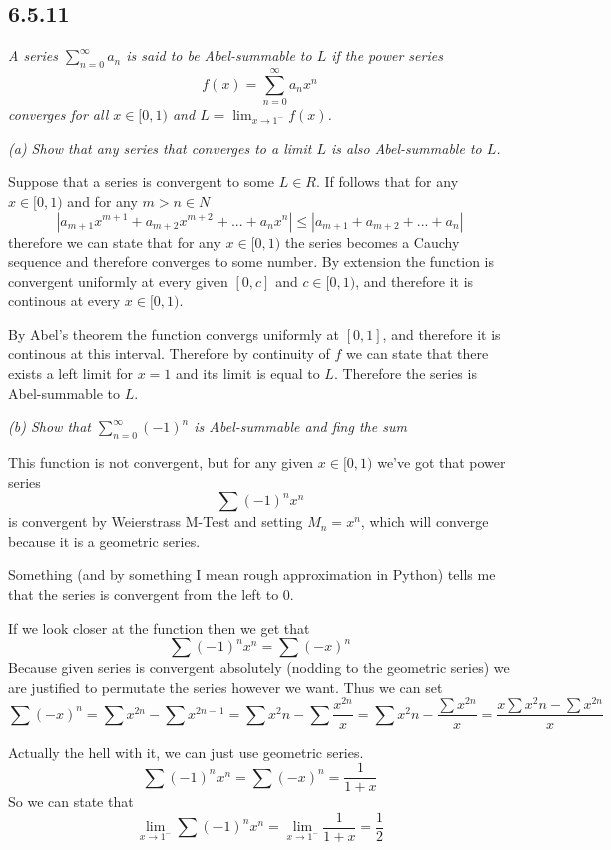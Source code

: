\documentclass[11pt,oneside,titlepage]{book}
\begin{document}
\subsection*{6.5.11}
\textit{A series $\sum_{n = 0}^{\infty}{a_n}$ is said to be Abel-summable to
  $L$ if the power series}
$$f(x) = \sum_{n = 0}^{\infty}{a_n x^n}$$
\textit{converges for all $x \in [0, 1)$ and $L = \lim_{x \to 1^-}{f(x)}$.}

\textit{(a) Show that any series that converges to a limit $L$ is also
  Abel-summable to $L$.}

Suppose that a series is convergent to some $L \in R$. If follows that
for  any $x \in [0, 1)$ and for any $m > n \in N$
$$|a_{m + 1} x^{m + 1} + a_{m + 2} x^{m + 2} + ... + a_n x^n| \leq
|a_{m + 1}  + a_{m + 2}  + ... + a_n|$$
therefore we can state that for any $x \in [0, 1)$ the series becomes a Cauchy
sequence and therefore converges to some number. By extension the
function is convergent uniformly  at every given $ [0, c]$ and $c \in [0, 1)$,
and therefore it is continous at every $x \in [0, 1)$.

By Abel's theorem the function convergs uniformly at $[0, 1]$, and therefore
it is continous at this interval. Therefore by continuity of $f$
we can state that there exists a left limit for $x = 1$ and its limit
is equal to $L$. Therefore the series is Abel-summable to $L$.

\textit{(b) Show that $\sum_{n = 0}^{\infty}{(-1)^n}$ is Abel-summable and
  fing the sum}

This function is not convergent, but for any given $x \in [0, 1)$ we've got
that power series
$$\sum (-1)^n x^n$$
is convergent by Weierstrass M-Test and setting $M_n = x^n$, which will
converge because it is a geometric series.

Something (and by something I mean rough approximation in Python) tells me
that the series is convergent from the left to 0.

If we look closer at the function then we get that
$$\sum (-1)^n x^n = \sum (-x)^n $$
Because given series  is convergent absolutely
(nodding to the geometric series) we are justified to permutate the series
however we want. Thus we can set
$$\sum (-x)^n =  \sum x^{2n} - \sum {x^{2n - 1}} =
\sum{x^2n} - \sum {\frac{x^{2n}}{x}} =
\sum{x^2n} - \frac{\sum {x^{2n}}}{x} =
\frac{x \sum{x^2n} - \sum {x^{2n}}}{x}
$$

Actually the hell with it, we can just use geometric series.
$$\sum (-1)^n x^n = \sum (-x)^n = \frac{1}{1 + x}$$
So we can state that
$$\lim_{x \to 1^-}{\sum (-1)^n x^n} =
\lim_{x \to 1^-}{\frac{1}{1 + x}} = \frac{1}{2}$$
\end{document}
